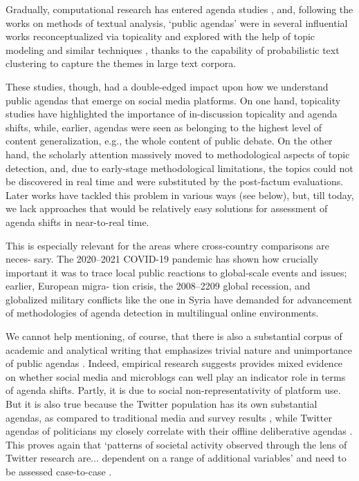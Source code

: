 Gradually, computational research has entered agenda studies \cite{RussellNeumanGuggenheimMoJang,Guo,KoltsovaBodrunova}, and, following the works on methods of textual analysis, ‘public agendas’ were in several influential works reconceptualized via topicality and explored with the help of topic modeling and similar techniques \cite{KoltsovaKoltcov}, thanks to the capability of probabilistic text clustering to capture the themes in large text corpora.

These studies, though, had a double-edged impact upon how we understand public agendas that emerge on social media platforms. On one hand, topicality studies have highlighted the importance of in-discussion topicality and agenda shifts, while, earlier, agendas were seen as belonging to the highest level of content generalization, e.g., the whole content of public debate. On the other hand, the scholarly attention massively moved to methodological aspects of topic detection, and, due to early-stage methodological limitations, the topics could not be discovered in real time and were substituted by the post-factum evaluations. Later works have tackled this problem in various ways (see below), but, till today, we lack approaches that would be relatively easy solutions for assessment of agenda shifts in near-to-real time.

This is especially relevant for the areas where cross-country comparisons are neces- sary. The 2020–2021 COVID-19 pandemic has shown how crucially important it was to trace local public reactions to global-scale events and issues; earlier, European migra- tion crisis, the 2008–2209 global recession, and globalized military conflicts like the one in Syria have demanded for advancement of methodologies of agenda detection in multilingual online environments.

We cannot help mentioning, of course, that there is also a substantial corpus of academic and analytical writing that emphasizes trivial nature and unimportance of public agendas \cite{Fuchs,MartinGrub}. Indeed, empirical research suggests provides mixed evidence on whether social media and microblogs can well play an indicator role in terms of agenda shifts. Partly, it is due to social non-representativity of platform use. But it is also true because the Twitter population has its own substantial agendas, as compared to traditional media and survey results \cite{PoseggaJungherr}, while Twitter agendas of politicians my closely correlate with their offline deliberative agendas \cite{CasasMorar}. This proves again that ‘patterns of societal activity observed through the lens of Twitter research are... dependent on a range of additional variables’ and need to be assessed case-to-case \cite[p.~4]{BrunsStieglitz}.

